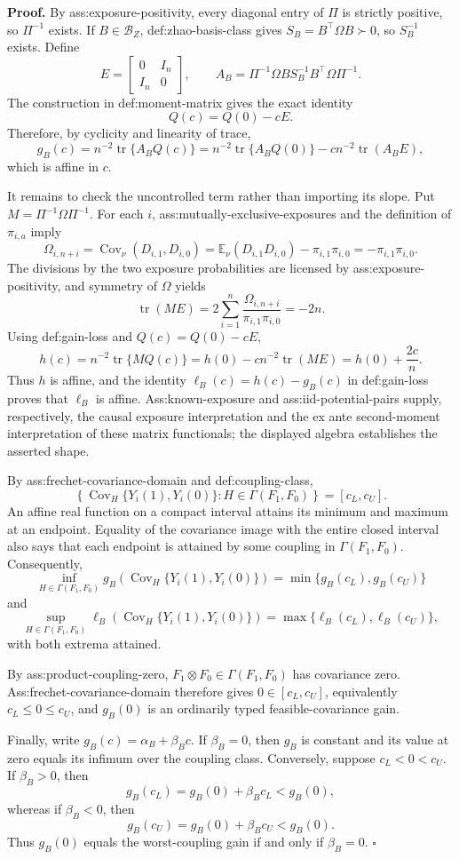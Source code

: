 \textbf{Proof.}
By ass:exposure-positivity, every diagonal entry of \(\Pi\) is strictly positive, so \(\Pi^{-1}\) exists.  If \(B\in\mathcal B_Z\), def:zhao-basis-class gives \(S_B=B^{\top}\Omega B\succ0\), so \(S_B^{-1}\) exists.  Define
\[
E=\begin{bmatrix}0&I_n\\ I_n&0\end{bmatrix},
\qquad
A_B=\Pi^{-1}\Omega B S_B^{-1}B^{\top}\Omega\Pi^{-1}.
\]
The construction in def:moment-matrix gives the exact identity
\[
Q(c)=Q(0)-cE.
\]
Therefore, by cyclicity and linearity of trace,
\[
g_B(c)
=n^{-2}\operatorname{tr}\{A_BQ(c)\}
=n^{-2}\operatorname{tr}\{A_BQ(0)\}
-c n^{-2}\operatorname{tr}(A_BE),
\]
which is affine in \(c\).

It remains to check the uncontrolled term rather than importing its slope.  Put \(M=\Pi^{-1}\Omega\Pi^{-1}\).  For each \(i\), ass:mutually-exclusive-exposures and the definition of \(\pi_{i,a}\) imply
\[
\Omega_{i,n+i}
=\operatorname{Cov}_{\nu}(D_{i,1},D_{i,0})
=\mathbb E_{\nu}(D_{i,1}D_{i,0})-\pi_{i,1}\pi_{i,0}
=-\pi_{i,1}\pi_{i,0}.
\]
The divisions by the two exposure probabilities are licensed by ass:exposure-positivity, and symmetry of \(\Omega\) yields
\[
\operatorname{tr}(ME)
=2\sum_{i=1}^n\frac{\Omega_{i,n+i}}{\pi_{i,1}\pi_{i,0}}
=-2n.
\]
Using def:gain-loss and \(Q(c)=Q(0)-cE\),
\[
h(c)=n^{-2}\operatorname{tr}\{MQ(c)\}
=h(0)-c n^{-2}\operatorname{tr}(ME)
=h(0)+\frac{2c}{n}.
\]
Thus \(h\) is affine, and the identity \(\ell_B(c)=h(c)-g_B(c)\) in def:gain-loss proves that \(\ell_B\) is affine.  Ass:known-exposure and ass:iid-potential-pairs supply, respectively, the causal exposure interpretation and the ex ante second-moment interpretation of these matrix functionals; the displayed algebra establishes the asserted shape.

By ass:frechet-covariance-domain and def:coupling-class,
\[
\left\{\operatorname{Cov}_H\{Y_i(1),Y_i(0)\}:H\in\Gamma(F_1,F_0)\right\}
=[c_L,c_U].
\]
An affine real function on a compact interval attains its minimum and maximum at an endpoint.  Equality of the covariance image with the entire closed interval also says that each endpoint is attained by some coupling in \(\Gamma(F_1,F_0)\).  Consequently,
\[
\inf_{H\in\Gamma(F_1,F_0)}
g_B\!\left(\operatorname{Cov}_H\{Y_i(1),Y_i(0)\}\right)
=\min\{g_B(c_L),g_B(c_U)\}
\]
and
\[
\sup_{H\in\Gamma(F_1,F_0)}
\ell_B\!\left(\operatorname{Cov}_H\{Y_i(1),Y_i(0)\}\right)
=\max\{\ell_B(c_L),\ell_B(c_U)\},
\]
with both extrema attained.

By ass:product-coupling-zero, \(F_1\otimes F_0\in\Gamma(F_1,F_0)\) has covariance zero.  Ass:frechet-covariance-domain therefore gives \(0\in[c_L,c_U]\), equivalently \(c_L\le0\le c_U\), and \(g_B(0)\) is an ordinarily typed feasible-covariance gain.

Finally, write \(g_B(c)=\alpha_B+\beta_Bc\).  If \(\beta_B=0\), then \(g_B\) is constant and its value at zero equals its infimum over the coupling class.  Conversely, suppose \(c_L<0<c_U\).  If \(\beta_B>0\), then
\[
g_B(c_L)=g_B(0)+\beta_Bc_L<g_B(0),
\]
whereas if \(\beta_B<0\), then
\[
g_B(c_U)=g_B(0)+\beta_Bc_U<g_B(0).
\]
Thus \(g_B(0)\) equals the worst-coupling gain if and only if \(\beta_B=0\). \(\square\)